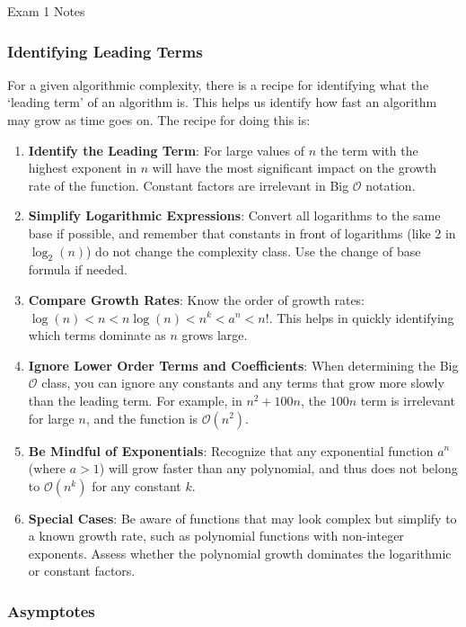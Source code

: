 \begin{examnotes}{Exam 1 Notes}
    \subsubsection*{Identifying Leading Terms}

    For a given algorithmic complexity, there is a recipe for identifying what the `leading term' of an algorithm is. This helps us identify how fast an algorithm may grow as time goes on. The recipe
    for doing this is:

    \begin{enumerate}
        \item \textbf{Identify the Leading Term}: For large values of $n$ the term with the highest exponent in $n$ will have the most significant impact on the growth rate of the function. Constant 
        factors are irrelevant in Big $\mathcal{O}$ notation.
        \item \textbf{Simplify Logarithmic Expressions}: Convert all logarithms to the same base if possible, and remember that constants in front of logarithms (like 2 in $\log_{2}{(n)}$) do not 
        change the complexity class. Use the change of base formula if needed.
        \item \textbf{Compare Growth Rates}: Know the order of growth rates: $\log{(n)} < n < n \log{(n)} < n^{k} < a^{n} < n!$. This helps in quickly identifying which terms dominate as $n$ grows large.
        \item \textbf{Ignore Lower Order Terms and Coefficients}: When determining the Big $\mathcal{O}$ class, you can ignore any constants and any terms that grow more slowly than the leading term. 
        For example, in $n^{2} + 100n$, the $100n$ term is irrelevant for large $n$, and the function is $\mathcal{O}(n^{2})$.
        \item \textbf{Be Mindful of Exponentials}: Recognize that any exponential function $a^{n}$ (where $a > 1$) will grow faster than any polynomial, and thus does not belong to $\mathcal{O}(n^{k})$ 
        for any constant $k$.
        \item \textbf{Special Cases}: Be aware of functions that may look complex but simplify to a known growth rate, such as polynomial functions with non-integer exponents. Assess whether the 
        polynomial growth dominates the logarithmic or constant factors.
    \end{enumerate}

    \subsubsection*{Asymptotes}


\end{examnotes}
